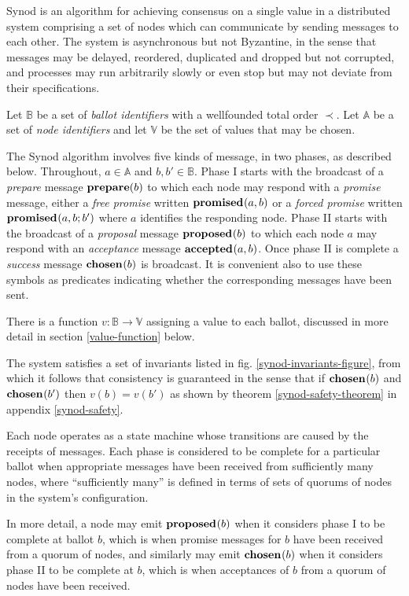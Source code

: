 \documentclass[journal]{IEEEtran}
\begin{document}
Synod\cite{part-time-parliament} is an algorithm for achieving consensus on a
single value in a distributed system comprising a set of nodes which can
communicate by sending messages to each other. The system is asynchronous but
not Byzantine, in the sense that messages may be delayed, reordered, duplicated
and dropped but not corrupted, and processes may run arbitrarily slowly or even
stop but may not deviate from their specifications.

Let $\mathbb B$ be a set of \textit{ballot identifiers} with a wellfounded
total order $\prec$. Let $\mathbb A$ be a set of \textit{node identifiers} and
let $\mathbb V$ be the set of values that may be chosen.

The Synod algorithm involves five kinds of message, in two phases, as described
below.  Throughout, $a \in \mathbb A$ and $b, b' \in \mathbb B$.  Phase I
starts with the broadcast of a \textit{prepare} message $\mathbf{prepare}(b)$ to which
each node may respond with a \textit{promise} message, either a \textit{free
promise} written $\mathbf{promised}_{}(a,b)$ or a \textit{forced promise} written
$\mathbf{promised}_{}(a,b;b')$ where $a$ identifies the responding node.  Phase II starts
with the broadcast of a \textit{proposal} message $\mathbf{proposed}_{}(b)$ to which each
node $a$ may respond with an \textit{acceptance} message $\mathbf{accepted}_{}(a,b)$. Once
phase II is complete a \textit{success} message $\mathbf{chosen}_{}(b)$ is broadcast.
It is convenient also to use these symbols as predicates indicating whether the
corresponding messages have been sent.

There is a function $v : \mathbb B \to \mathbb V$ assigning a value to each
ballot, discussed in more detail in section \ref{value-function} below.

The system satisfies a set of invariants listed in fig.
\ref{synod-invariants-figure}, from which it follows that consistency is
guaranteed in the sense that if $\mathbf{chosen}_{}(b)$ and $\mathbf{chosen}_{}(b')$ then $v(b) =
v(b')$ as shown by theorem \ref{synod-safety-theorem} in appendix
\ref{synod-safety}.

Each node operates as a state machine whose transitions are caused by the
receipts of messages. Each phase is considered to be complete for a particular
ballot when appropriate messages have been received from sufficiently many
nodes, where ``sufficiently many'' is defined in terms of sets of quorums of
nodes in the system's configuration.

In more detail, a node may emit $\mathbf{proposed}_{}(b)$ when it considers phase I to be
complete at ballot $b$, which is when promise messages for $b$ have been
received from a quorum of nodes, and similarly may emit $\mathbf{chosen}_{}(b)$ when
it considers phase II to be complete at $b$, which is when acceptances of $b$
from a quorum of nodes have been received.
\end{document}
